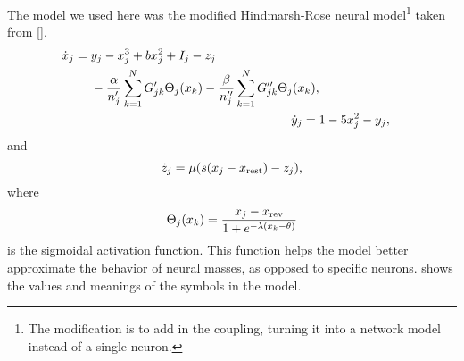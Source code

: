 The model we used here was the modified Hindmarsh-Rose neural model\footnote{The modification is to add in the coupling, turning it into a network model instead of a single neuron.} taken from [].
\begin{align}
  \begin{split}
  \label{eq:hr_x}
  \dot{x}_{j}
  ={}&
    y_{j}
    -
    x_{j}^{3}
    +
    b x_{j}^{2}
    +
    I_{j}
    -
    z_{j} \\
    & -
    \frac{\alpha}{n'_{j}} \sum_{k = 1}^{N} G'_{j k} \Theta_{j}(x_{k})
    -
    \frac{\beta}{n''_{j}} \sum_{k = 1}^{N} G''_{j k} \Theta_{j}(x_{k}),
    \end{split} \\
  \label{eq:hr_y}
  \dot{y}_{j}
  ={}&
    1
    -
    5 x_{j}^{2}
    -
    y_{j}, \\
\end{align}
and
\begin{equation}
  \label{eq:hr_z}
  \dot{\hrz}_{j}
  ={}
    \mu \pqty{s \pqty{\hrx_{j} - \hrx_{\text{rest}}} - \hrz_{j}},
\end{equation}
where
\begin{equation}
  \label{eq:hr_sigmoid}
  \Theta_{j}(\hrx_{k})
  =
  \frac{\hrx_{j} - \hrx_{\text{rev}}}{1 + e^{-\lambda \pqty{\hrx_{k} - \theta}}}
\end{equation}
is the sigmoidal activation function.
This function helps the model better approximate the behavior of neural masses, as opposed to specific neurons.
 shows the values and meanings of the symbols in the model.

